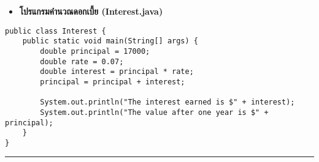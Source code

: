 \documentclass[11pt]{article}
\begin{document}
\begin{itemize}
\item \textbf{โปรแกรมคำนวณดอกเบี้ย (Interest.java)}
\end{itemize}

\begin{verbatim}
public class Interest {
    public static void main(String[] args) {
        double principal = 17000;
        double rate = 0.07;
        double interest = principal * rate;
        principal = principal + interest;

        System.out.println("The interest earned is $" + interest);
        System.out.println("The value after one year is $" + principal);
    }
}
\end{verbatim}

\noindent\rule{\textwidth}{0.5pt}
\end{document}
